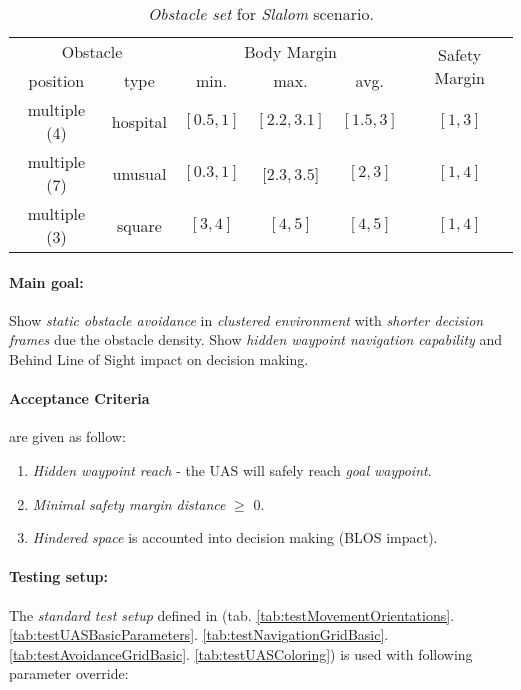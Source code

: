 \begin{table}[H]
    \centering
    \begin{tabular}{c|c|c|c|c|c}
        \multicolumn{2}{c|}{Obstacle} & \multicolumn{3}{c|}{Body Margin} & \multirow{2}{*}{Safety Margin}\\\cline{1-5}
        position & type & min. & max. & avg. &   \\\hline\hline
        multiple (4) & hospital & $[0.5,1]$ & $[2.2,3.1]$ & $[1.5,3]$  & $[1,3]$ \\\hline 
        multiple (7) & unusual  & $[0.3,1]$ & $[2.3,3.5$] & $[2,3]$  & $[1,4]$ \\\hline
        multiple (3) & square   & $[3,4]$   & $[4,5]$     & $[4,5]$ & $[1,4]$   \\
     \end{tabular}
    \caption{\emph{Obstacle set} for \emph{Slalom} scenario.}
    \label{tab:obstacleSetSlalom}
\end{table}

\paragraph{Main goal:} Show \emph{static obstacle avoidance} in \emph{clustered environment} with \emph{shorter decision frames} due the obstacle density. Show \emph{hidden waypoint navigation capability} and Behind Line of Sight impact on decision making. 

\paragraph{Acceptance Criteria} are given as follow: 
\begin{enumerate}
    \item \emph{Hidden waypoint reach} - the UAS will safely reach \emph{goal waypoint}.
    \item \emph{Minimal safety margin distance} $\ge$ 0.
    \item \emph{Hindered space} is accounted into decision making (BLOS impact).
\end{enumerate}

\paragraph{Testing setup:}  The \emph{standard test setup} defined in (tab.  \ref{tab:testMovementOrientations}. \ref{tab:testUASBasicParameters}. \ref{tab:testNavigationGridBasic}. \ref{tab:testAvoidanceGridBasic}. \ref{tab:testUASColoring}) is used with following parameter override:

